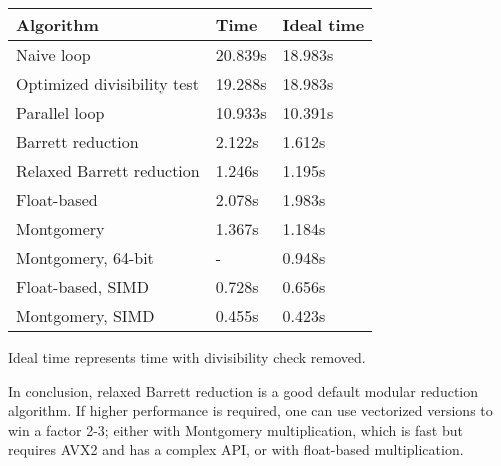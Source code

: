 \vspace{1mm}
\noindent
\begin{tabular}{|l|l|l|}
\hline
Algorithm & Time & Ideal time \\
\hline
Naive loop & 20.839s & 18.983s \\
Optimized divisibility test & 19.288s & 18.983s \\
Parallel loop & 10.933s & 10.391s \\
Barrett reduction & 2.122s & 1.612s \\
Relaxed Barrett reduction & 1.246s & 1.195s \\
Float-based & 2.078s & 1.983s \\
Montgomery & 1.367s & 1.184s \\
Montgomery, 64-bit & - & 0.948s \\
Float-based, SIMD & 0.728s & 0.656s \\
Montgomery, SIMD & 0.455s & 0.423s \\
\hline
\end{tabular}
\vspace{1mm}

\noindent
Ideal time represents time with divisibility check removed.

In conclusion, relaxed Barrett reduction is a good default modular reduction algorithm.
If higher performance is required, one can use vectorized versions to win a factor 2-3; either with
Montgomery multiplication, which is fast but requires AVX2 and has a complex API, or with
float-based multiplication.
